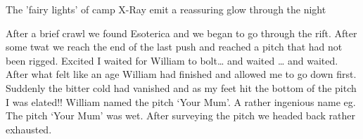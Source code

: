 \begin{marginfigure}
\centering
  \caption{The 'fairy lights' of camp X-Ray emit a reassuring glow through the night}
\end{marginfigure}

After a brief crawl we found Esoterica and we began to go through the rift. After some twat we reach the end of the last push and reached a pitch that had not been rigged. Excited I waited for William to bolt… and waited … and waited. After what felt like an age William had finished and allowed me to go down first. Suddenly the bitter cold had vanished and as my feet hit the bottom of the pitch I was elated!! William named the pitch ‘Your Mum’. A rather ingenious name eg. The pitch ‘Your Mum’ was wet. After surveying the pitch we headed back rather exhausted. 



